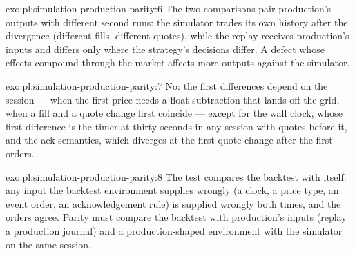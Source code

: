 \begin{solution}{exo:pl:simulation-production-parity:6}
The two comparisons pair production's outputs with different second runs: the simulator trades its own history after the divergence
(different fills, different quotes), while the replay receives production's inputs and differs only where the strategy's decisions differ.
A defect whose effects compound through the market affects more outputs against the simulator.
\end{solution}

\begin{solution}{exo:pl:simulation-production-parity:7}
No: the first differences depend on the session --- when the first price needs a float subtraction that lands off the grid, when a fill and
a quote change first coincide --- except for the wall clock, whose first difference is the timer at thirty seconds in any session with
quotes before it, and the ack semantics, which diverges at the first quote change after the first orders.
\end{solution}

\begin{solution}{exo:pl:simulation-production-parity:8}
The test compares the backtest with itself: any input the backtest environment supplies wrongly (a clock, a price type, an event order, an
acknowledgement rule) is supplied wrongly both times, and the orders agree. Parity must compare the backtest with production's inputs
(replay a production journal) and a production-shaped environment with the simulator on the same session.
\end{solution}


